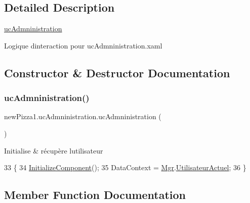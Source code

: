 \subsection{Detailed Description}
\hyperlink{classnewPizza1_1_1ucAdmninistration}{uc\+Admninistration} 

Logique d\textquotesingle{}interaction pour uc\+Admninistration.\+xaml 

\subsection{Constructor \& Destructor Documentation}
\mbox{\label{classnewPizza1_1_1ucAdmninistration_affb0f76e62a39bc80006086513f73825}} 
\subsubsection{\texorpdfstring{uc\+Admninistration()}{ucAdmninistration()}}
{\footnotesize\ttfamily new\+Pizza1.\+uc\+Admninistration.\+uc\+Admninistration (\begin{DoxyParamCaption}{ }\end{DoxyParamCaption})\hspace{0.3cm}{\ttfamily [inline]}}



Initialise \& récupère l\textquotesingle{}utilisateur 


\begin{DoxyCode}
33         \{
34             \hyperlink{classnewPizza1_1_1ucAdmninistration_a500966f5d66cf50194a823a88df8517e}{InitializeComponent}();
35             DataContext = \hyperlink{classnewPizza1_1_1ucAdmninistration_a74229d73a1ccb7500c882d4425c05753}{Mgr}.\hyperlink{classModele_1_1Manager_aa00c4632bd15b247d6b6793a6797dc82}{UtilisateurActuel};
36         \}
\end{DoxyCode}


\subsection{Member Function Documentation}
\mbox{\label{classnewPizza1_1_1ucAdmninistration_a500966f5d66cf50194a823a88df8517e}} 
